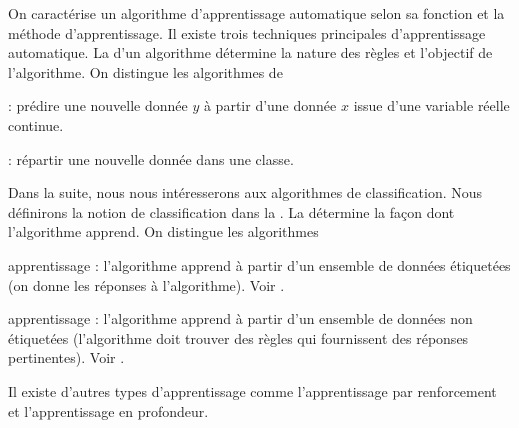 \documentclass[12pt,fancy]{cours}
\begin{document}
On caractérise un algorithme d'apprentissage automatique selon sa fonction et la méthode d'apprentissage. Il existe trois techniques principales d'apprentissage automatique. La  d'un algorithme détermine la nature des règles et l'objectif de l'algorithme. On distingue les algorithmes de
\begin{liste}
    \item {} : prédire une nouvelle donnée $y$ à partir d'une donnée $x$ issue d'une variable réelle continue.
    \item {} : répartir une nouvelle donnée dans une classe.
\end{liste}
Dans la suite, nous nous intéresserons aux algorithmes de classification. Nous définirons la notion de classification dans la .
La  détermine la façon dont l'algorithme apprend. On distingue les algorithmes
\begin{liste}
    \item apprentissage  : l'algorithme apprend à partir d'un ensemble de données étiquetées (on donne les réponses à l'algorithme). Voir .
    \item apprentissage  : l'algorithme apprend à partir d'un ensemble de données non étiquetées (l'algorithme doit trouver des règles qui fournissent des réponses pertinentes). Voir .
\end{liste}
\begin{remarque}
    Il existe d'autres types d'apprentissage comme l'apprentissage par renforcement et l'apprentissage en profondeur.
\end{remarque}
\end{document}
